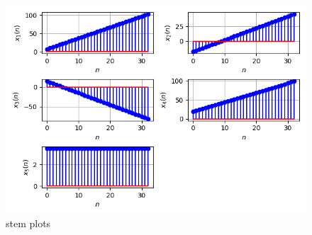 \documentclass[journal,12pt,twocolumn]{IEEEtran}
\theoremstyle{remark}
\begin{document}
\begin{enumerate}
\begin{figure}[h!]
    \centering
    \includegraphics[width=\columnwidth]{ncert-maths/10/5/2/1/figs/10.png}
    \caption{stem plots }
    \label{fig:ESFIG1}
\end{figure}
\end{enumerate}

\end{document}
